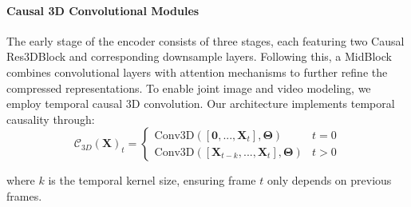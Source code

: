 \paragraph{Causal 3D Convolutional Modules}
The early stage of the encoder consists of three stages, each featuring two Causal Res3DBlock and corresponding downsample layers. Following this, a MidBlock combines convolutional layers with attention mechanisms to further refine the compressed representations.
To enable joint image and video modeling, we employ temporal causal 3D convolution.
Our architecture implements temporal causality through:
\begin{equation}
    \mathcal{C}_{3D}(\mathbf{X})_t = 
    \begin{cases} 
        \text{Conv3D}([\mathbf{0},...,\mathbf{X}_{t}], \mathbf{\Theta}) & t=0 \\
        \text{Conv3D}([\mathbf{X}_{t-k},...,\mathbf{X}_t], \mathbf{\Theta}) & t>0 
    \end{cases}
\end{equation}

where $k$ is the temporal kernel size, ensuring frame $t$ only depends on previous frames.

